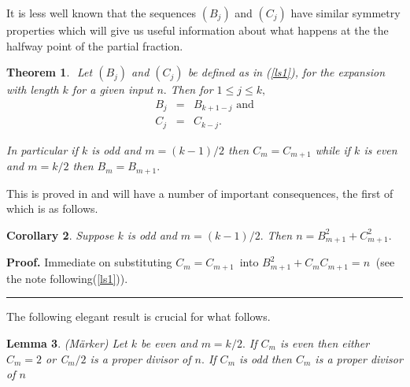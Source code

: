 \documentclass[12pt]{article}
\newtheorem{theorem}{Theorem}
\newtheorem{corollary}[theorem]{Corollary}
\newtheorem{lemma}[theorem]{Lemma}
\newenvironment{proof}[1][Proof]{\textbf{#1.} }{\ \rule{0.5em}{0.5em}}
\begin{document}
It is less well known that the sequences $\left( B_{j}\right) $ and $\left(
C_{j}\right) $ have similar symmetry properties which will give us useful
information about what happens at the the halfway point of the partial
fraction.

\begin{theorem}
$\label{sy1}$ Let $\left( B_{j}\right) $ and $\left( C_{j}\right) $ be
defined as in (\ref{ls1}), for the expansion with length $k$ for a given
input $n.$ Then for $1\leq j\leq k,$ 
\begin{eqnarray}
B_{j} &=&B_{k+1-j}\text{ and}  \label{sy2} \\
C_{j} &=&C_{k-j}.  \label{sy3}
\end{eqnarray}

In particular if $k$ is odd and $m=\left( k-1\right) /2$ then $C_{m}=C_{m+1}$
while if $k$ is even and $m=k/2$ then $B_{m}=B_{m+1}.$
\end{theorem}

This is proved in \cite[Section 3.4]{Jacobson:2009:JW} and will have a
number of important consequences, the first of which is as follows.

\begin{corollary}
\label{sy4}Suppose $k$ is odd and $m=\left( k-1\right) /2.$ Then $%
n=B_{m+1}^{2}+C_{m+1}^{2}.$
\end{corollary}

\begin{proof}
Immediate on substituting $C_{m}=C_{m+1}$\ into $B_{m+1}^{2}+C_{m}C_{m+1}=n$ 
$\ $(see the note following(\ref{ls1})).
\end{proof}

The following elegant result is crucial for what follows.

\begin{lemma}
\label{sy5}\textrm{(}M\"{a}rker\cite{Marker:1840:UP}\textrm{)} Let $k$ be
even and $m=k/2.$ If $C_{m}$ is even then either $C_{m}=2$ or C$_{m}/2$ is a
proper divisor of $n.$ If $C_{m}$ is odd then $C_{m}$ is a proper divisor of 
$n$
\end{lemma}
\end{document}
